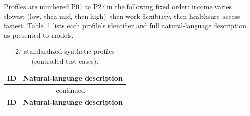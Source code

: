 Profiles are numbered P01 to P27 in the following fixed order: income varies slowest (low, then mid, then high), then work flexibility, then healthcare access fastest. Table~\ref{tab:27profiles} lists each profile's identifier and full natural-language description as presented to models.

\begin{longtable}{p{1.2cm}p{12cm}}
\caption{27 standardized synthetic profiles (controlled test cases).}\label{tab:27profiles}\\
\toprule
\textbf{ID} & \textbf{Natural-language description} \\
\midrule
\endfirsthead
\multicolumn{2}{c}{{\tablename\ \thetable{} -- continued}} \\
\toprule
\textbf{ID} & \textbf{Natural-language description} \\
\midrule
\endhead
\bottomrule
\endfoot


\end{longtable}
